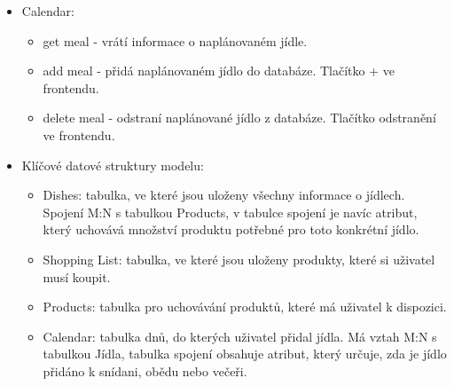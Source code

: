 \documentclass[a4paper,12pt]{article}
\begin{document}
\begin{itemize}
\item Calendar: 
\begin{itemize}
    \item get meal - vrátí informace o naplánovaném jídle. 
    \item add meal - přidá naplánovaném jídlo do databáze. Tlačítko + ve frontendu.
    \item delete meal - odstraní naplánované jídlo z databáze. Tlačítko odstranění ve frontendu.


    \end{itemize}
    \item  Klíčové datové struktury modelu:
    \begin{itemize}
    \item Dishes: tabulka, ve které jsou uloženy všechny informace o jídlech. Spojení M:N
s tabulkou Products, v tabulce spojení je navíc atribut, který uchovává množství produktu potřebné pro toto konkrétní jídlo.
\item Shopping List: tabulka, ve které jsou uloženy produkty, které si uživatel musí koupit.
\item Products: tabulka pro uchovávání produktů, které má uživatel k dispozici.
\item Calendar: tabulka dnů, do kterých uživatel přidal jídla. Má vztah M:N
s tabulkou Jídla, tabulka spojení obsahuje atribut, který určuje, zda je jídlo přidáno k snídani, obědu nebo večeři.
    \end{itemize}
\end{itemize}
\end{document}
